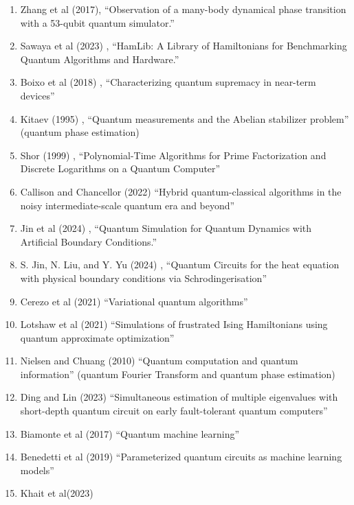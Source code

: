 \documentclass[a4paper,fleqn]{cas-sc}
\begin{document}
\begin{enumerate}
\item Zhang et al (2017)\cite{zhang2017observation}, 
``Observation of a many-body dynamical phase transition 
with a 53-qubit quantum simulator.''
\item Sawaya et al (2023) \cite{10313872}, ``HamLib: A Library of Hamiltonians for Benchmarking Quantum Algorithms and Hardware.''
\item Boixo et al (2018) \cite{boixo2018characterizing}, ``Characterizing quantum supremacy in near-term devices''
\item Kitaev (1995) \cite{kitaev1995quantum}, ``Quantum measurements and the Abelian stabilizer problem'' (quantum phase estimation)
\item Shor (1999) \cite{doi:10.1137/S0036144598347011}, ``Polynomial-Time Algorithms for Prime Factorization and Discrete Logarithms on a Quantum Computer''
\item Callison and Chancellor (2022) \cite{callison2022hybrid} ``Hybrid quantum-classical algorithms in the noisy intermediate-scale quantum era and beyond''
\item Jin et al (2024) \cite{doi:10.1137/23M1563451}, ``Quantum Simulation for Quantum Dynamics with Artificial Boundary Conditions.''
\item S. Jin, N. Liu, and Y. Yu (2024) \cite{jin2024quantum}, ``Quantum Circuits for the heat equation with physical boundary conditions via Schrodingerisation''
\item 
Cerezo et al (2021) \cite{cerezo2021variational} ``Variational quantum algorithms''
\item
Lotshaw et al (2021) \cite{doi:10.1098/rsta.2021.0414} ``Simulations of frustrated Ising Hamiltonians using quantum approximate optimization''
\item Nielsen and Chuang (2010) \cite{nielsen2010quantum}
``Quantum computation and quantum information'' (quantum Fourier Transform and
quantum phase estimation)
\item Ding and Lin (2023) \cite{ding2023simultaneous}
``Simultaneous estimation of multiple eigenvalues with short-depth quantum circuit on early fault-tolerant quantum computers''
\item Biamonte et al (2017) \cite{biamonte2017quantum}
``Quantum machine learning''
\item Benedetti et al (2019)\cite{Benedetti_2019}
``Parameterized quantum circuits as machine learning models''
\item Khait et al(2023) \cite{khait2023variational}

\end{enumerate}
\end{document}
